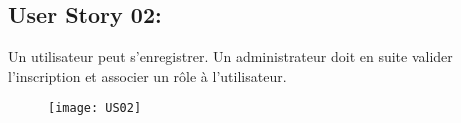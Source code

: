 \subsection{User Story 02:}
Un utilisateur peut s'enregistrer. Un administrateur doit en suite valider l'inscription et associer un rôle à l'utilisateur.

\begin{figure}[!h]
  \begin{center}
        \texttt{[image: US02]}
        \label{US02-dia}
  \end{center}
\end{figure}